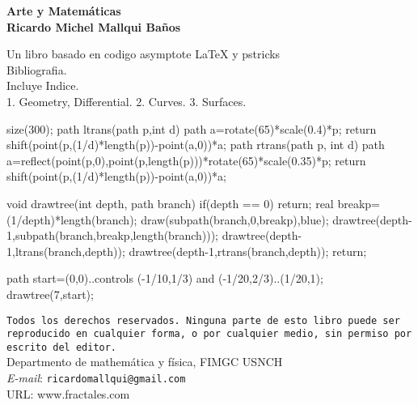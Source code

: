 \documentclass[a4paper]{book}
\begin{document}
 {
 	\thispagestyle{empty}
 	\noindent\bf{Arte y Matemáticas}\\
 	\bf{Ricardo Michel Mallqui Baños}\\
 	\vspace{3cm}

\noindent Un libro basado en codigo asymptote LaTeX y pstricks\\

\noindent Bibliografia.\\
\noindent Incluye Indice.\\
1. Geometry, Differential. 2. Curves. 3. Surfaces. \\
 	\vfill
 	\noindent
 		\begin{asy}
 	size(300);
 	path ltrans(path p,int d)
 	{
 	path a=rotate(65)*scale(0.4)*p;
 	return shift(point(p,(1/d)*length(p))-point(a,0))*a;
 	}
 	path rtrans(path p, int d)
 	{
 	path a=reflect(point(p,0),point(p,length(p)))*rotate(65)*scale(0.35)*p;
 	return shift(point(p,(1/d)*length(p))-point(a,0))*a;
 	}

 	void drawtree(int depth, path branch)
 	{
 	if(depth == 0) return;
 	real breakp=(1/depth)*length(branch);
 	draw(subpath(branch,0,breakp),blue);
 	drawtree(depth-1,subpath(branch,breakp,length(branch)));
 	drawtree(depth-1,ltrans(branch,depth));
 	drawtree(depth-1,rtrans(branch,depth));
 	return;
 	}

 	path start=(0,0)..controls (-1/10,1/3) and (-1/20,2/3)..(1/20,1);
 	drawtree(7,start);
 	\end{asy}

\noindent %
\texttt{Todos los derechos reservados. Ninguna parte de esto
libro puede ser reproducido en cualquier forma,
o por cualquier medio, sin permiso
por escrito del editor.}\\
Departmento de mathemática y física, FIMGC USNCH\\
\emph{E-mail}: \texttt{ricardomallqui@gmail.com}\\
URL: \textsf{www.fractales.com}

 }
\newpage
\renewcommand\listfigurename{Índice general}
\setcounter{page}{1}
\tableofcontents
\renewcommand\listfigurename{Lista de figuras}
\listoffigures
\end{document}
